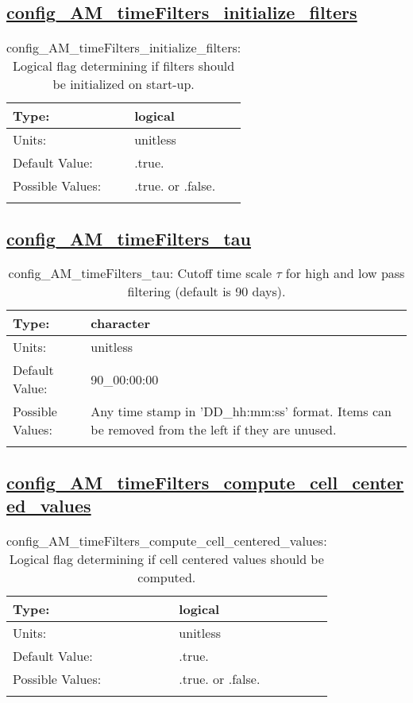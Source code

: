\subsection[config\_AM\_timeFilters\_initialize\_filters]{\hyperref[sec:nm_tab_AM_timeFilters]{config\_AM\_timeFilters\_initialize\_filters}}
\label{subsec:nm_sec_config_AM_timeFilters_initialize_filters}
\begin{center}
\begin{longtable}{| p{2.0in} || p{4.0in} |}
    \hline
    Type: & logical \\
    \hline
    Units: & \si{unitless} \\
    \hline
    Default Value: & .true. \\
    \hline
    Possible Values: & .true. or .false. \\
    \hline
    \caption{config\_AM\_timeFilters\_initialize\_filters: Logical flag determining if filters should be initialized on start-up.}
\end{longtable}
\end{center}
\subsection[config\_AM\_timeFilters\_tau]{\hyperref[sec:nm_tab_AM_timeFilters]{config\_AM\_timeFilters\_tau}}
\label{subsec:nm_sec_config_AM_timeFilters_tau}
\begin{center}
\begin{longtable}{| p{2.0in} || p{4.0in} |}
    \hline
    Type: & character \\
    \hline
    Units: & \si{unitless} \\
    \hline
    Default Value: & 90\_00:00:00 \\
    \hline
    Possible Values: & Any time stamp in 'DD\_hh:mm:ss' format. Items can be removed from the left if they are unused. \\
    \hline
    \caption{config\_AM\_timeFilters\_tau: Cutoff time scale $\tau$ for high and low pass filtering (default is 90 days).}
\end{longtable}
\end{center}
\subsection[config\_AM\_timeFilters\_compute\_cell\_centered\_values]{\hyperref[sec:nm_tab_AM_timeFilters]{config\_AM\_timeFilters\_compute\_cell\_centered\_values}}
\label{subsec:nm_sec_config_AM_timeFilters_compute_cell_centered_values}
\begin{center}
\begin{longtable}{| p{2.0in} || p{4.0in} |}
    \hline
    Type: & logical \\
    \hline
    Units: & \si{unitless} \\
    \hline
    Default Value: & .true. \\
    \hline
    Possible Values: & .true. or .false. \\
    \hline
    \caption{config\_AM\_timeFilters\_compute\_cell\_centered\_values: Logical flag determining if cell centered values should be computed.}
\end{longtable}
\end{center}
